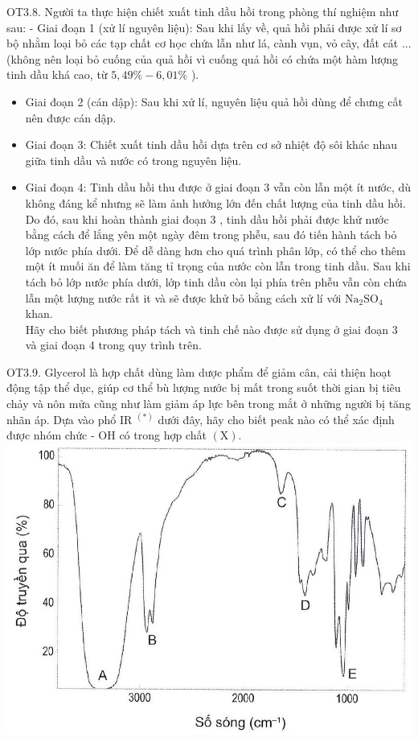 \documentclass[10pt]{article}
\begin{document}
OT3.8. Người ta thực hiện chiết xuất tinh dầu hồi trong phòng thí nghiệm như sau: - Giai đoạn 1 (xử lí nguyên liệu): Sau khi lấy về, quả hồi phải được xử lí sơ bộ nhằm loại bỏ các tạp chất cơ học chứa lẫn như lá, cành vụn, vỏ cây, đất cát ... (không nên loại bỏ cuống của quả hồi vì cuống quả hồi có chứa một hàm lượng tinh dầu khá cao, từ $5,49 \%-6,01 \%$ ).

\begin{itemize}
  \item Giai đoạn 2 (cán dập): Sau khi xử lí, nguyên liệu quả hồi dùng để chưng cất nên được cán dập.
  \item Giai đoạn 3: Chiết xuất tinh dầu hồi dựa trên cơ sở nhiệt độ sôi khác nhau giữa tinh dầu và nước có trong nguyên liệu.
  \item Giai đoạn 4: Tinh dầu hồi thu được ở giai đoạn 3 vẫn còn lẫn một ít nước, dù không đáng kể nhưng sẽ làm ảnh hưởng lớn đến chất lượng của tinh dầu hồi. Do đó, sau khi hoàn thành giai đoạn 3 , tinh dầu hồi phải được khử nước bằng cách để lắng yên một ngày đêm trong phễu, sau đó tiến hành tách bỏ lớp nước phía dưới. Để dễ dàng hơn cho quá trình phân lớp, có thể cho thêm một ít muối ăn để làm tăng tỉ trọng của nước còn lẫn trong tinh dầu. Sau khi tách bỏ lớp nước phía dưới, lớp tinh dầu còn lại phía trên phễu vẫn còn chứa lẫn một lượng nước rất it và sẽ được khử bỏ bằng cách xử lí với $\mathrm{Na}_{2} \mathrm{SO}_{4}$ khan.\\
Hãy cho biết phương pháp tách và tinh chế nào được sử dụng ở giai đoạn 3 và giai đoạn 4 trong quy trình trên.
\end{itemize}

OT3.9. Glycerol là hợp chất dùng làm dược phẩm để giảm cân, cải thiện hoạt động tập thể dục, giúp cơ thể bù lượng nước bị mất trong suốt thời gian bị tiêu chảy và nôn mửa cũng như làm giảm áp lực bên trong mắt ở những người bị tăng nhãn áp. Dựa vào phổ IR ${ }^{(*)}$ dưới đây, hãy cho biết peak nào có thể xác định được nhóm chức - OH có trong hợp chất $(\mathrm{X})$.\\
\includegraphics[max width=\textwidth, center]{2025_10_23_ae7aef68fb3b41082d29g-22}
\end{document}
